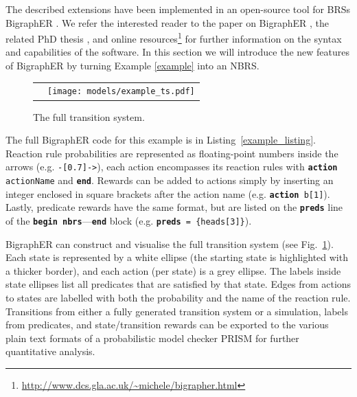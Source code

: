 \documentclass[runningheads]{llncs}
\begin{document}
The described extensions have been implemented in an open-source tool for BRSs
BigraphER \cite{DBLP:conf/cav/SevegnaniC16}. We refer the interested reader to
the paper on BigraphER \cite{DBLP:conf/cav/SevegnaniC16}, the related PhD thesis
\cite{DBLP:phd/ethos/Sevegnani12}, and online
resources\footnote{\url{http://www.dcs.gla.ac.uk/~michele/bigrapher.html}} for
further information on the syntax and capabilities of the software. In this
section we will introduce the new features of BigraphER by turning Example
\ref{example} into an NBRS.

\begin{figure}
  \centering
  \begin{tabular}{p{}p{}}
    \begin{minipage}{0.5\textwidth}
      \centering
      
    \end{minipage}
    &
      \begin{minipage}{0.5\textwidth}
        \centering
        \vspace{12mm}
        \texttt{[image: models/example\_ts.pdf]}
        \caption{The full transition system.}
        \label{example_ts}
      \end{minipage}
  \end{tabular}
\end{figure}

The full BigraphER code for this example is in Listing~\ref{example_listing}.
Reaction rule probabilities are represented as floating-point numbers inside the
arrows (e.g. \texttt{-[0.7]->}), each action encompasses its reaction rules with
\texttt{\textbf{action} actionName} and \texttt{\textbf{end}}. Rewards can be
added to actions simply by inserting an integer enclosed in square brackets
after the action name (e.g. \texttt{\textbf{action} b[1]}). Lastly, predicate
rewards have the same format, but are listed on the \texttt{\textbf{preds}} line
of the \texttt{\textbf{begin nbrs}}---\texttt{\textbf{end}} block (e.g.
\texttt{\textbf{preds} = \{heads[3]\}}).

BigraphER can construct and visualise the full transition system (see
Fig.~\ref{example_ts}). Each state is represented by a white ellipse (the
starting state is highlighted with a thicker border), and each action (per
state) is a grey ellipse. The labels inside state ellipses list all predicates
that are satisfied by that state. Edges from actions to states are labelled with
both the probability and the name of the reaction rule. Transitions from either
a fully generated transition system or a simulation, labels from predicates, and
state/transition rewards can be exported to the various plain text formats of a
probabilistic model checker PRISM \cite{DBLP:conf/cav/KwiatkowskaNP11} for
further quantitative analysis.
\end{document}
